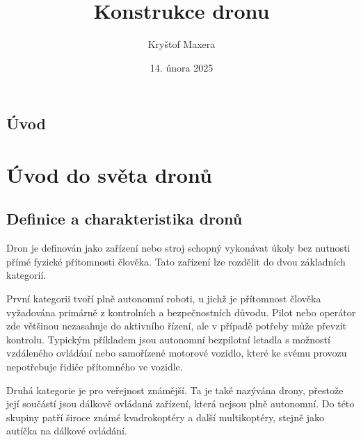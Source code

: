 \documentclass[12pt]{report}
\author{Kryštof Maxera}                  %
\title{Konstrukce dronu}    %
\date{14. února 2025}                 %
\begin{document}
	\mytitlepage						%
	
	
	\abstrakt{
		\lipsum[1]						%
	}{
		\lipsum[1]						%
	}
	
	\podekovani{
		\lipsum[2]						%
	}
	
   {\tableofcontents\newpage}			%
	
\addtocounter{page}{1}		%
\chapter*{Úvod}     %
	
\lipsum[1]	
	
\part{Úvod do světa dronů}  %
	
\chapter{Definice a charakteristika dronů}

Dron je definován jako zařízení nebo stroj schopný vykonávat úkoly bez nutnosti přímé fyzické přítomnosti člověka. Tato zařízení lze rozdělit do dvou základních kategorií.

První kategorii tvoří plně autonomní roboti, u jichž je přítomnost člověka vyžadována primárně z kontrolních a bezpečnostních důvodu. Pilot nebo operátor zde většinou nezasahuje do aktivního řízení, ale v případě potřeby může převzít kontrolu. Typickým příkladem jsou autonomní bezpilotní letadla s možností vzdáleného ovládání nebo samořízené motorové vozidlo, které ke svému provozu nepotřebuje řidiče přítomného ve vozidle.

Druhá kategorie je pro veřejnost známější. Ta je také nazývána drony, přestože její součástí jsou dálkově ovládaná zařízení, která nejsou plně autonomní. Do této skupiny patří široce známé kvadrokoptéry a další multikoptéry, stejně jako autíčka na dálkové ovládání.
\end{document}
